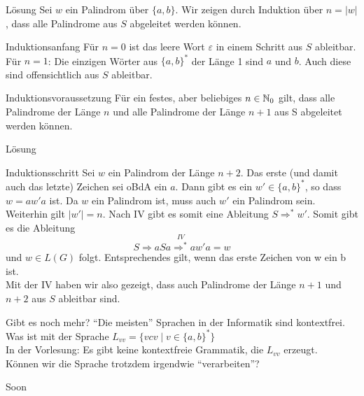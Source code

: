 \begin{frame}{Lösung}
	Sei $w$ ein Palindrom über $\{a, b\}$. Wir zeigen durch Induktion über $n = \vert w \vert$, dass alle Palindrome aus $S$ abgeleitet werden können. \pause
	\begin{block}{Induktionsanfang} \pause
		Für $n = 0$ ist das leere Wort $\varepsilon$ in einem Schritt aus $S$ ableitbar. \\
		Für $n=1$: Die einzigen Wörter aus $\{a, b\}^\ast$ der Länge 1 sind $a$ und $b$. Auch diese sind offensichtlich aus $S$ ableitbar.
	\end{block}
 	\pause
	\begin{block}{Induktionsvoraussetzung} \pause
		Für ein festes, aber beliebiges $n \in \mathbb{N}_0$ gilt, dass alle Palindrome der Länge $n$ und alle Palindrome der Länge $n + 1$ aus S abgeleitet werden können.
	\end{block}
\end{frame}

\begin{frame}{Lösung}
		\begin{block}{Induktionsschritt}
			Sei $w$ ein Palindrom der Länge $n + 2$. Das erste (und damit auch das letzte) Zeichen sei oBdA ein $a$. Dann gibt es ein $w' \in \{a, b\}^\ast$, so dass $w = aw'a$ ist. Da $w$ ein Palindrom ist, muss auch $w'$ ein Palindrom sein. Weiterhin gilt $|w'| = n$. \pause Nach IV gibt es somit eine Ableitung $S \Rightarrow^\ast w'$. Somit gibt es die Ableitung $$S \Rightarrow aSa \overset{IV}{\Rightarrow^\ast} aw'a = w$$ und $w \in L(G)$ folgt. \pause Entsprechendes gilt, wenn das erste Zeichen von w ein b ist. \\
			Mit der IV haben wir also gezeigt, dass auch Palindrome der Länge $n+1$ und $n+2$ aus $S$ ableitbar sind.
	\end{block}

\end{frame}

\begin{frame}{Gibt es noch mehr?}
	\enquote{Die meisten} Sprachen in der Informatik sind kontextfrei.\\[1em]
	Was ist mit der Sprache $L_{vv} = \{vcv \mid v \in \{a, b\}^*\}$\\
	\pause
	In der Vorlesung: Es gibt keine kontextfreie Grammatik, die $L_{vv}$ erzeugt.\\
	\pause
	Können wir die Sprache trotzdem irgendwie \enquote{verarbeiten}?
	
	\begin{block}{}
		\Large
		\centering
		Soon\\[1em]
	\end{block}
\end{frame}
